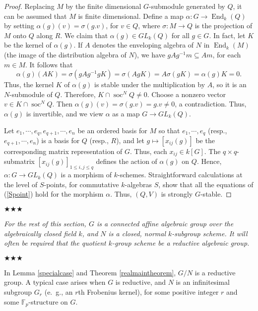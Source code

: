 \documentclass[11pt,leqno,amscd,amssymb,verbatim, url]{amsart}
\theoremstyle{definition}
\numberwithin{equation}{thm}
\newcommand{\End}{\operatorname{End}}
\newcommand{\soc}{\operatorname{soc}}
\begin{document}
\begin{proof} Replacing $M$ by the finite dimensional $G$-submodule generated by $Q$,
 it can be assumed that $M$ is finite
dimensional. Define a map $\alpha:G\to \End_k(Q)$ by setting $\alpha(g)(v)=\sigma(g.v)$, for $v\in Q$, where $\sigma:M\to Q$ is the
projection of $M$ onto $Q$ along $R$. We claim that $\alpha(g)\in GL_k(Q)$ for all $g\in G$. In fact, let
$K$ be the kernel of $\alpha(g)$.  If $A$ denotes the enveloping algebra of $N$ in $\End_k(M)$ (the
image of the distribution algebra of $N$), we have $gAg^{-1}m\subseteq Am$, for each $m\in M$. It 
follows that
$$\alpha(g)(AK)=\sigma(gAg^{-1}gK)= \sigma(AgK)=A\sigma(gK)=\alpha(g)K=0.$$
Thus, the kernel $K$ of $\alpha(g)$ is stable under the multiplication by $A$, so it is an $N$-submodule
of $Q$.
Therefore, $K\cap \soc^NQ\not=0$. Choose a nonzero vector $v\in K\cap\soc^NQ$. Then $\alpha(g)(v)=
\sigma(g.v)=g.v\not=0$, a contradiction. Thus, $\alpha(g)$ is invertible, and we view $\alpha$
as a map $G\to GL_k(Q)$.

Let $e_1,\cdots, e_q,
e_{q+1},\cdots, e_n$ be an ordered basis for $M$ so that $e_1,\cdots, e_q$ (resp., $e_{q+1},\cdots, e_n$) is a basis for $Q$ (resp.,
$R$), and let $g\mapsto [x_{ij}(g)]$ be the corresponding matrix representation of $G$. Thus, each $x_{ij}\in k[G]$. The
$q\times q$-submatrix $[x_{ij}(g)]_{1\leq i,j\leq q}$ defines the action of $\alpha(g)$ on $Q$. Hence, $\alpha:G\to GL_k(Q)$
is a morphism of $k$-schemes.  Straightforward calculations at the level of $S$-points, for commutative
$k$-algebras $S$, show that all the equations of (\ref{Spoint}) hold for the morphism $\alpha$. Thus, $(Q,V)$ is strongly $G$-stable.
\end{proof}
\medskip
\begin{center}{\bf{\large
$\bigstar\bigstar\bigstar$}}\end{center}
\medskip

{\it For the rest of this section,  $G$ is a connected affine algebraic group over the algebraically closed field $k$, and $N$ is a closed,
normal $k$-subgroup scheme. It will often be required that the quotient $k$-group scheme  be a reductive
algebraic group.}

\medskip
\begin{center}{\bf{\large $\bigstar\bigstar\bigstar$}}\end{center}\medskip

 In Lemma \ref{specialcase} and Theorem \ref{realmaintheorem}, $G/N$ is a reductive group.
A typical case arises when $G$ is reductive, and $N$ is
 an infinitesimal subgroup $G_r$ (e.~g., an $r$th Frobenius kernel), for some positive integer $r$ and some ${\mathbb F}_p$-structure on $G$.
\end{document}
